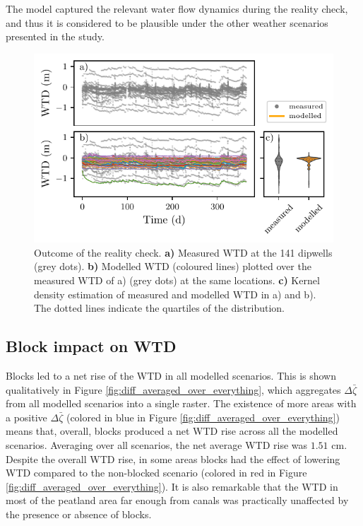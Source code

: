 \documentclass[bg, manuscript]{copernicus}
\begin{document}
The model captured the relevant water flow dynamics during the reality check, and thus it is considered to be plausible under the other weather scenarios presented in the study.



\begin{figure}[t]
\includegraphics[width=12 cm]{figs/reality_check.pdf}
\caption{Outcome of the reality check. \textbf{a)} Measured WTD at the 141 dipwells (grey dots). \textbf{b)} Modelled WTD (coloured lines) plotted over the measured WTD of a) (grey dots) at the same locations. \textbf{c)} Kernel density estimation of measured and modelled WTD in a) and b). The dotted lines indicate the quartiles of the distribution.}
\label{fig:modelled_vs_measured}
\end{figure}   

\subsection{Block  impact on WTD}
Blocks led to a net rise of the WTD in all modelled scenarios.
This is shown qualitatively in Figure \ref{fig:diff_averaged_over_everything}, which aggregates  $\Delta \bar{\zeta}$ from all modelled scenarios into a single raster.
The existence of more areas with a positive $\Delta \bar{\zeta}$ (colored in blue in Figure \ref{fig:diff_averaged_over_everything}) means that, overall, blocks produced a net WTD rise across all the modelled scenarios.
Averaging over all  scenarios, the net average WTD rise was $1.51$ \unit{cm}. 
Despite the overall WTD rise, in some areas blocks had the effect of lowering WTD compared to the non-blocked scenario (colored in red in Figure \ref{fig:diff_averaged_over_everything}).
It is also remarkable that the WTD in most of the peatland area far enough from canals was practically unaffected by the presence or absence of blocks.
\end{document}
